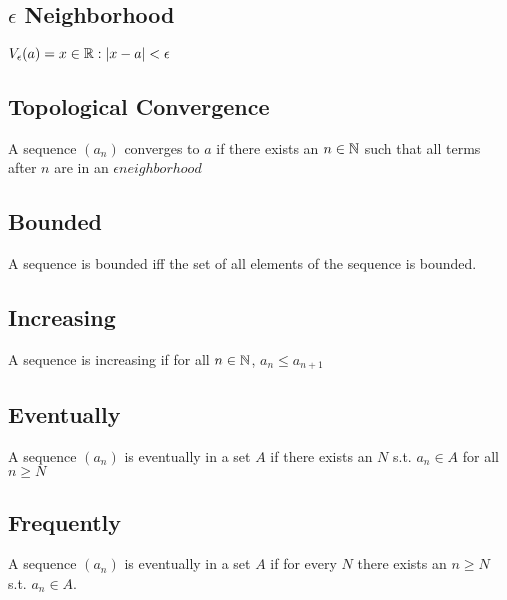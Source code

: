 \documentclass{article}
\begin{document}
\subsection{$\epsilon$ Neighborhood}
$V_\epsilon (a) = {x \in \protect\mathbb{R} : |x-a| < \epsilon}$

\subsection{Topological Convergence}
A sequence $(a_n)$ converges to $a$ if there exists an $n \in \protect\mathbb{N}$ such that all terms after $n$ are in an $\epsilon neighborhood$

\subsection{Bounded}
A sequence is bounded iff the set of all elements of the sequence is bounded.
\subsection{Increasing}
A sequence is increasing if for all $n \in \protect\mathbb{N}$, $a_n \le a_{n+1}$

\subsection{Eventually}
A sequence $(a_n)$ is eventually in a set $A$ if there exists an $N$ s.t. $a_n \in A$ for all $n \ge N$

\subsection{Frequently}
A sequence $(a_n)$ is eventually in a set $A$ if for every $N$  there exists an $n \ge N$ s.t. $a_n \in A$.
\end{document}
